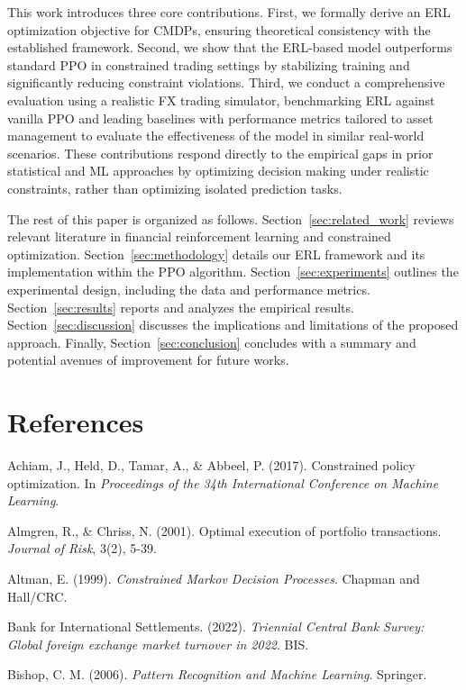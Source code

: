 \documentclass[12pt,a4paper]{article}
\begin{document}
This work introduces three core contributions. First, we formally derive an ERL optimization objective for CMDPs, ensuring theoretical consistency with the established framework. Second, we show that the ERL-based model outperforms standard PPO in constrained trading settings by stabilizing training and significantly reducing constraint violations. Third, we conduct a comprehensive evaluation using a realistic FX trading simulator, benchmarking ERL against vanilla PPO and leading baselines with performance metrics tailored to asset management to evaluate the effectiveness of the model in similar real-world scenarios. These contributions respond directly to the empirical gaps in prior statistical and ML approaches by optimizing decision making under realistic constraints, rather than optimizing isolated prediction tasks.

The rest of this paper is organized as follows. Section~\ref{sec:related_work} reviews relevant literature in financial reinforcement learning and constrained optimization. Section~\ref{sec:methodology} details our ERL framework and its implementation within the PPO algorithm. Section~\ref{sec:experiments} outlines the experimental design, including the data and performance metrics. Section~\ref{sec:results} reports and analyzes the empirical results. Section~\ref{sec:discussion} discusses the implications and limitations of the proposed approach. Finally, Section~\ref{sec:conclusion} concludes with a summary and potential avenues of improvement for future works.

\section*{References}

Achiam, J., Held, D., Tamar, A., \& Abbeel, P. (2017). Constrained policy optimization. In \textit{Proceedings of the 34th International Conference on Machine Learning}.

Almgren, R., \& Chriss, N. (2001). Optimal execution of portfolio transactions. \textit{Journal of Risk}, 3(2), 5-39.

Altman, E. (1999). \textit{Constrained Markov Decision Processes}. Chapman and Hall/CRC.

Bank for International Settlements. (2022). \textit{Triennial Central Bank Survey: Global foreign exchange market turnover in 2022}. BIS.

Bishop, C. M. (2006). \textit{Pattern Recognition and Machine Learning}. Springer.
\end{document}
